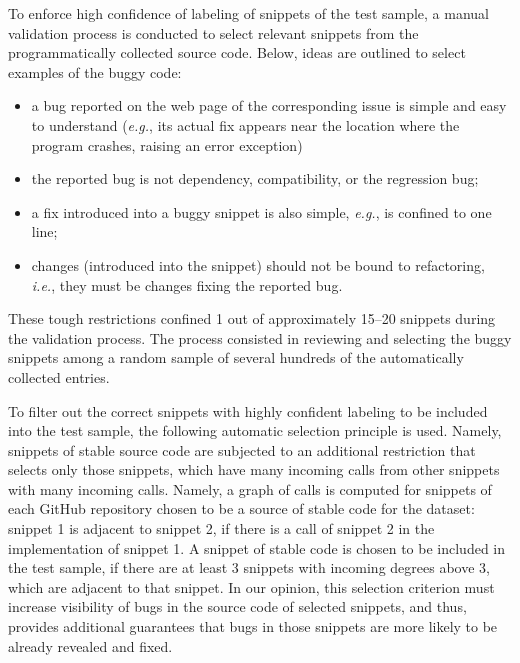 \documentclass[10pt,conference]{IEEEtran}
\begin{document}
To enforce high confidence of labeling of snippets of the test sample, a manual validation process is conducted to select
relevant snippets from the programmatically collected source code.
Below, ideas are outlined to select examples of the buggy code:
\begin{itemize}
\item a bug reported on the web page of the corresponding issue is simple and easy to understand  (\textit{e.g.}, its actual fix appears near the location where the program crashes, raising an error exception)

\item the reported bug is not dependency, compatibility, or the regression bug;

\item a fix introduced into a buggy snippet is also simple, \textit{e.g.}, is confined to one line;

\item changes (introduced into the snippet) should not be bound to refactoring, \textit{i.e.}, they must be changes fixing the reported bug.
\end{itemize}

These tough restrictions confined 1 out of approximately 15--20 snippets during the validation process. 
The process consisted in reviewing and selecting the buggy snippets among a random sample of several hundreds of the automatically collected entries. 

To filter out the correct snippets with highly confident labeling to be included into the test sample, the following automatic selection principle is used.
Namely, snippets of stable source code are subjected to an additional restriction that
 selects only those snippets, which have many incoming calls from other snippets with many incoming calls. Namely, a graph of calls is computed for snippets of each GitHub repository chosen 
to be a source of stable code for the dataset: snippet 1 is adjacent to snippet 2, if there is a call of snippet 2 in the implementation of snippet 1. A snippet of stable
code is chosen to be included in the test sample, if there are at least 3 snippets with incoming degrees above 3, which are adjacent to that snippet.
In our opinion, this selection criterion must increase visibility of bugs in the source code of selected snippets, and thus, provides additional guarantees that bugs in 
those snippets are more likely to be already revealed and fixed.
\end{document}
